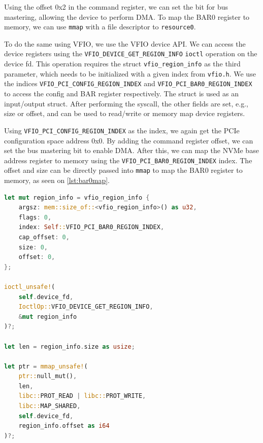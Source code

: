 Using the offset 0x2 in the command register, we can set the bit for bus mastering, allowing the device to perform DMA.
To map the BAR0 register to memory, we can use \texttt{mmap} with a file descriptor to \texttt{resource0}.

To do the same using VFIO, we use the VFIO device API.
We can access the device registers using the \texttt{VFIO\_DEVICE\_GET\_REGION\_INFO} \texttt{ioctl} operation on the device fd. This operation requires the struct \texttt{vfio\_region\_info} as the third parameter, which needs to be initialized with a given index from \texttt{vfio.h}.
We use the indices \texttt{VFIO\_PCI\_CONFIG\_REGION\_INDEX} and \texttt{VFIO\_PCI\_BAR0\_REGION\_INDEX} to access the config and BAR register respectively. The struct is used as an input/output struct.
After performing the syscall, the other fields are set, e.g., size or offset, and can be used to read/write or memory map device registers.

Using \texttt{VFIO\_PCI\_CONFIG\_REGION\_INDEX} as the index, we again get the PCIe configuration space address 0x0. By adding the command register offset, we can set the bus mastering bit to enable DMA.
After this, we can map the NVMe base address register to memory using the \texttt{VFIO\_PCI\_BAR0\_REGION\_INDEX} index.
The offset and size can be directly passed into \texttt{mmap} to map the BAR0 register to memory, as seen on \autoref{lst:bar0map}.

\begin{minipage}{.95\linewidth}
    \begin{lstlisting}[language=Rust,caption={Mapping the BAR0 NVMe register to memory}, label=lst:bar0map]
let mut region_info = vfio_region_info {
    argsz: mem::size_of::<vfio_region_info>() as u32,
    flags: 0,
    index: Self::VFIO_PCI_BAR0_REGION_INDEX,
    cap_offset: 0,
    size: 0,
    offset: 0,
};

ioctl_unsafe!(
    self.device_fd,
    IoctlOp::VFIO_DEVICE_GET_REGION_INFO,
    &mut region_info
)?;

let len = region_info.size as usize;

let ptr = mmap_unsafe!(
    ptr::null_mut(),
    len,
    libc::PROT_READ | libc::PROT_WRITE,
    libc::MAP_SHARED,
    self.device_fd,
    region_info.offset as i64
)?; 
\end{lstlisting}
\end{minipage}

